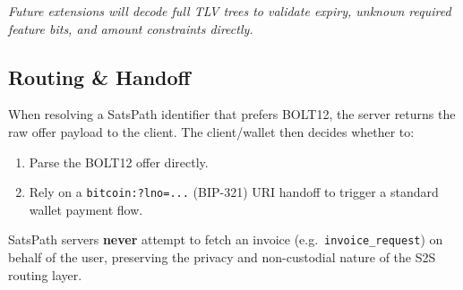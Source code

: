 \documentclass[
]{article}
\providecommand{\tightlist}{%
  \setlength{\itemsep}{0pt}\setlength{\parskip}{0pt}}
\begin{document}
\emph{Future extensions will decode full TLV trees to validate expiry,
unknown required feature bits, and amount constraints directly.}

\hypertarget{routing-handoff}{%
\subsection{Routing \& Handoff}\label{routing-handoff}}

When resolving a SatsPath identifier that prefers BOLT12, the server
returns the raw offer payload to the client. The client/wallet then
decides whether to:

\begin{enumerate}
\def\labelenumi{\arabic{enumi}.}
\tightlist
\item
  Parse the BOLT12 offer directly.
\item
  Rely on a \texttt{bitcoin:?lno=...} (BIP-321) URI handoff to trigger a
  standard wallet payment flow.
\end{enumerate}

SatsPath servers \textbf{never} attempt to fetch an invoice
(e.g.~\texttt{invoice\_request}) on behalf of the user, preserving the
privacy and non-custodial nature of the S2S routing layer.
\end{document}
